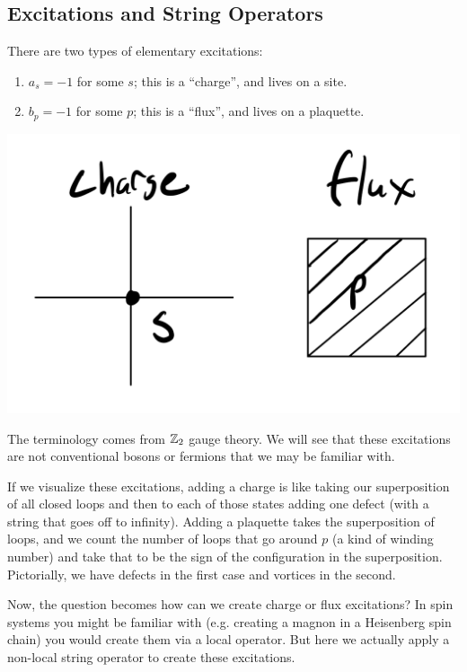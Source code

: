 \subsection{Excitations and String Operators}
There are two types of elementary excitations:
\begin{enumerate}
    \item $a_s = -1$ for some $s$; this is a ``charge'', and lives on a site.
    \item $b_p = -1$ for some $p$; this is a ``flux'', and lives on a plaquette.
\end{enumerate}
\begin{center}
    \includegraphics[scale=0.4]{Lectures/Images/lec1-excitations.png}
\end{center}
The terminology comes from $\mathbb{Z}_2$ gauge theory. We will see that these excitations are not conventional bosons or fermions that we may be familiar with.

If we visualize these excitations, adding a charge is like taking our superposition of all closed loops and then to each of those states adding one defect (with a string that goes off to infinity). Adding a plaquette takes the superposition of loops, and we count the number of loops that go around $p$ (a kind of winding number) and take that to be the sign of the configuration in the superposition. Pictorially, we have defects in the first case and vortices in the second.

Now, the question becomes how can we create charge or flux excitations? In spin systems you might be familiar with (e.g. creating a magnon in a Heisenberg spin chain) you would create them via a local operator. But here we actually apply a non-local string operator to create these excitations.

